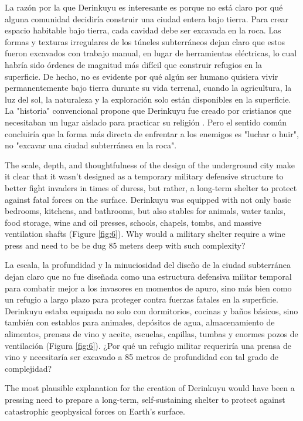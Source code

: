 \documentclass[10pt,twocolumn,letterpaper]{article}
\begin{document}
La razón por la que Derinkuyu es interesante es porque no está claro por qué alguna comunidad decidiría construir una ciudad entera bajo tierra. Para crear espacio habitable bajo tierra, cada cavidad debe ser excavada en la roca. Las formas y texturas irregulares de los túneles subterráneos dejan claro que estos fueron excavados con trabajo manual, en lugar de herramientas eléctricas, lo cual habría sido órdenes de magnitud más difícil que construir refugios en la superficie. De hecho, no es evidente por qué algún ser humano quisiera vivir permanentemente bajo tierra durante su vida terrenal, cuando la agricultura, la luz del sol, la naturaleza y la exploración solo están disponibles en la superficie. La "historia" convencional propone que Derinkuyu fue creado por cristianos que necesitaban un lugar aislado para practicar su religión \cite{53}. Pero el sentido común concluiría que la forma más directa de enfrentar a los enemigos es "luchar o huir", no "excavar una ciudad subterránea en la roca".

The scale, depth, and thoughtfulness of the design of the underground city make it clear that it wasn't designed as a temporary military defensive structure to better fight invaders in times of duress, but rather, a long-term shelter to protect against fatal forces on the surface. Derinkuyu was equipped with not only basic bedrooms, kitchens, and bathrooms, but also stables for animals, water tanks, food storage, wine and oil presses, schools, chapels, tombs, and massive ventilation shafts (Figure \ref{fig:6}). Why would a military shelter require a wine press and need to be be dug 85 meters deep with such complexity?

La escala, la profundidad y la minuciosidad del diseño de la ciudad subterránea dejan claro que no fue diseñada como una estructura defensiva militar temporal para combatir mejor a los invasores en momentos de apuro, sino más bien como un refugio a largo plazo para proteger contra fuerzas fatales en la superficie. Derinkuyu estaba equipada no solo con dormitorios, cocinas y baños básicos, sino también con establos para animales, depósitos de agua, almacenamiento de alimentos, prensas de vino y aceite, escuelas, capillas, tumbas y enormes pozos de ventilación (Figura \ref{fig:6}). ¿Por qué un refugio militar requeriría una prensa de vino y necesitaría ser excavado a 85 metros de profundidad con tal grado de complejidad?

The most plausible explanation for the creation of Derinkuyu would have been a pressing need to prepare a long-term, self-sustaining shelter to protect against catastrophic geophysical forces on Earth's surface.
\end{document}
